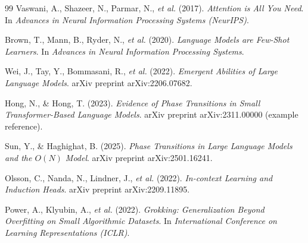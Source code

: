 \documentclass[12pt]{article}
\begin{document}
\begin{thebibliography}{99}
Vaswani, A., Shazeer, N., Parmar, N., \textit{et al.} (2017). \textit{Attention is All You Need}. In \textit{Advances in Neural Information Processing Systems (NeurIPS)}.

Brown, T., Mann, B., Ryder, N., \textit{et al.} (2020). \textit{Language Models are Few-Shot Learners}. In \textit{Advances in Neural Information Processing Systems}.

Wei, J., Tay, Y., Bommasani, R., \textit{et al.} (2022). \textit{Emergent Abilities of Large Language Models}. arXiv preprint arXiv:2206.07682.

Hong, N., \& Hong, T. (2023). \textit{Evidence of Phase Transitions in Small Transformer-Based Language Models}. arXiv preprint arXiv:2311.00000 (example reference).

Sun, Y., \& Haghighat, B. (2025). \textit{Phase Transitions in Large Language Models and the $O(N)$ Model}. arXiv preprint arXiv:2501.16241.

Olsson, C., Nanda, N., Lindner, J., \textit{et al.} (2022). \textit{In-context Learning and Induction Heads}. arXiv preprint arXiv:2209.11895.

Power, A., Klyubin, A., \textit{et al.} (2022). \textit{Grokking: Generalization Beyond Overfitting on Small Algorithmic Datasets}. In \textit{International Conference on Learning Representations (ICLR)}.
\end{thebibliography}
\end{document}
